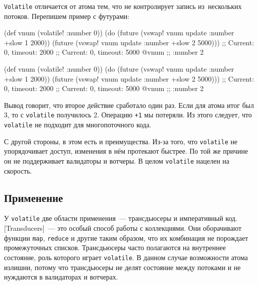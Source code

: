 \fi

\verb|Volatile| отличается от атома тем, что не контролирует запись
из~нескольких потоков. Перепишем пример с футурами:

\ifnarrow

\begin{english}
  \begin{clojure}
(def vnum (volatile! {:number 0}))
(do (future (vswap! vnum update
              :number +slow 1 2000))
    (future (vswap! vnum update
              :number +slow 2 5000)))
;; Current: 0, timeout: 2000
;; Current: 0, timeout: 5000
@vnum ;; {:number 2}
  \end{clojure}
\end{english}

\else

\begin{english}
  \begin{clojure}
(def vnum (volatile! {:number 0}))
(do (future (vswap! vnum update :number +slow 1 2000))
    (future (vswap! vnum update :number +slow 2 5000)))
;; Current: 0, timeout: 2000
;; Current: 0, timeout: 5000
@vnum ;; {:number 2}
  \end{clojure}
\end{english}

\fi


Вывод говорит, что второе действие сработало один раз. Если для атома итог был
3, то с \verb|volatile| получилось 2. Операцию \verb|+1| мы потеряли. Из
этого следует, что \verb|volatile| не подходит для многопоточного кода.

С другой стороны, в этом есть и преимущества. Из-за того, что \verb|volatile| не
упорядочивает доступ, изменения в нём протекают быстрее. По той же причине он не
поддерживает валидаторы и вотчеры. В целом \verb|volatile| нацелен на скорость.

\subsection{Применение}

У \verb|volatile| две области применения~--- трансдьюсеры и императивный
код. [Transducers]~---
это особый способ работы с коллекциями. Они оборачивают функции \verb|map|,
\verb|reduce| и другие таким образом, что их комбинация не порождает
промежуточных списков. Трансдьюсеры часто полагаются на внутреннее состояние,
роль которого играет \texttt{volatile}. В данном случае возможности атома
излишни, потому что трансдьюсеры не делят состояние между потоками и не
нуждаются в валидаторах и вотчерах.

